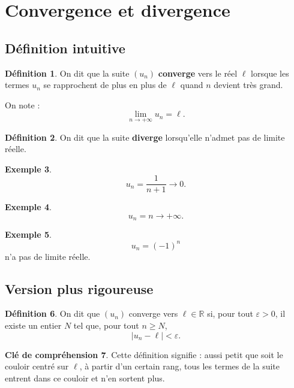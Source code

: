 \documentclass[11pt,a4paper]{article}
\theoremstyle{definition}
\newtheorem{definition}{Définition}[section]
\newtheorem{exemple}[definition]{Exemple}
\newtheorem{interpretation}[definition]{Clé de compréhension}
\theoremstyle{plain}
\theoremstyle{remark}
\newcommand{\R}{\mathbb{R}}
\newcommand{\eps}{\varepsilon}
\begin{document}
\section{Convergence et divergence}

\subsection{Définition intuitive}

\begin{definition}
On dit que la suite $(u_n)$ \textbf{converge} vers le réel $\ell$ lorsque les termes $u_n$ se rapprochent de plus en plus de $\ell$ quand $n$ devient très grand.

On note :
\[
\lim_{n\to+\infty}u_n=\ell.
\]
\end{definition}

\begin{definition}
On dit que la suite \textbf{diverge} lorsqu'elle n'admet pas de limite réelle.
\end{definition}

\begin{exemple}
\[
u_n=\frac1{n+1}\longrightarrow 0.
\]
\end{exemple}

\begin{exemple}
\[
u_n=n\longrightarrow +\infty.
\]
\end{exemple}

\begin{exemple}
\[
u_n=(-1)^n
\]
n'a pas de limite réelle.
\end{exemple}

\subsection{Version plus rigoureuse}

\begin{definition}
On dit que $(u_n)$ converge vers $\ell\in\R$ si, pour tout $\eps>0$, il existe un entier $N$ tel que, pour tout $n\geq N$,
\[
|u_n-\ell|<\eps.
\]
\end{definition}

\begin{interpretation}
Cette définition signifie : aussi petit que soit le couloir centré sur $\ell$, à partir d'un certain rang, tous les termes de la suite entrent dans ce couloir et n'en sortent plus.
\end{interpretation}
\end{document}
